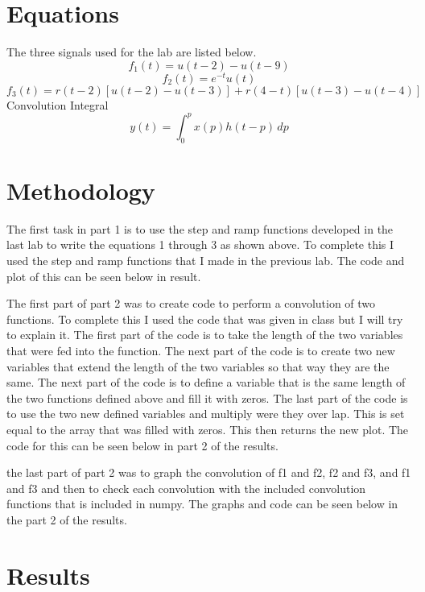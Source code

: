 \documentclass[11pt,a4]{report}
\begin{document}
\section{Equations}
The three signals used for the lab are listed below.
\begin{equation}
    f_1(t) = u(t-2) - u(t-9)
\end{equation}
\begin{equation}
    f_2(t) = e^{-t}u(t)
\end{equation}
\begin{equation}
    f_3(t) = r(t-2)[u(t-2)-u(t-3)] + r(4-t)[u(t-3)-u(t-4)]
\end{equation}
Convolution Integral
\begin{equation}
    y(t) =  \int_{0}^{p} x(p)h(t-p) \,dp 
\end{equation}
\section{Methodology}
The first task in part 1 is to use the step and ramp functions developed in the last lab to write the equations 1 through 3 as shown above. To complete this I used the step and ramp functions that I made in the previous lab. The code and plot of this can be seen below in result. 

The first part of part 2 was to create code to perform a convolution of two functions. To complete this I used the code that was given in class but I will try to explain it. The first part of the code is to take the length of the two variables that were fed into the function. The next part of the code is to create two new variables that extend the length of the two variables so that way they are the same. The next part of the code is to define a variable that is the same length of the two functions defined above and fill it with zeros. The last part of the code is to use the two new defined variables and multiply were they over lap. This is set equal to the array that was filled with zeros. This then returns the new plot. The code for this can be seen below in part 2 of the results. 

the last part of part 2 was to graph the convolution of f1 and f2, f2 and f3, and f1 and f3 and then to check each convolution with the included convolution functions that is included in numpy. The graphs and code can be seen below in the part 2 of the results. 


\section{Results}
\end{document}
